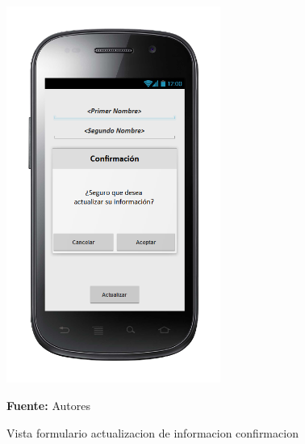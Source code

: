\begin{figure}[!htb]
  \begin{center}
\includegraphics[width=7cm]{./imagenes/UI/Usuarios/formulario_actualizacion_de_informacion_confirmacion.png}
    \caption{Vista formulario actualizacion de informacion confirmacion}
    \label{fig:Vista_formulario_actualizacion_de_informacion_confirmacion}
    \textbf{Fuente:}  Autores
  \end{center}
\end{figure}
